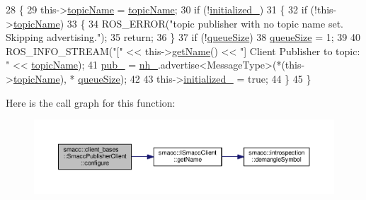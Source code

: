 \begin{DoxyCode}
28   \{
29     this->\hyperlink{classsmacc_1_1client__bases_1_1SmaccPublisherClient_a8b8d98aef9b3b3a441005d2cb17b4fcc}{topicName} = \hyperlink{classsmacc_1_1client__bases_1_1SmaccPublisherClient_a8b8d98aef9b3b3a441005d2cb17b4fcc}{topicName};
30     \textcolor{keywordflow}{if} (!\hyperlink{classsmacc_1_1client__bases_1_1SmaccPublisherClient_acb2fbd8b9797ce286d9ecc0419e2cc55}{initialized\_})
31     \{
32       \textcolor{keywordflow}{if} (!this->\hyperlink{classsmacc_1_1client__bases_1_1SmaccPublisherClient_a8b8d98aef9b3b3a441005d2cb17b4fcc}{topicName})
33       \{
34         ROS\_ERROR(\textcolor{stringliteral}{"topic publisher with no topic name set. Skipping advertising."});
35         \textcolor{keywordflow}{return};
36       \}
37       \textcolor{keywordflow}{if} (!\hyperlink{classsmacc_1_1client__bases_1_1SmaccPublisherClient_a1a9b98681b01953f134191799a029fd3}{queueSize})
38         \hyperlink{classsmacc_1_1client__bases_1_1SmaccPublisherClient_a1a9b98681b01953f134191799a029fd3}{queueSize} = 1;
39 
40       ROS\_INFO\_STREAM(\textcolor{stringliteral}{"["} << this->\hyperlink{classsmacc_1_1ISmaccClient_a20846aabfd1de832aa27d7a8237a1742}{getName}() << \textcolor{stringliteral}{"] Client Publisher to topic: "} << 
      \hyperlink{classsmacc_1_1client__bases_1_1SmaccPublisherClient_a8b8d98aef9b3b3a441005d2cb17b4fcc}{topicName});
41       \hyperlink{classsmacc_1_1client__bases_1_1SmaccPublisherClient_af39f498e73e8f956aae312065a4fd093}{pub\_} = \hyperlink{classsmacc_1_1client__bases_1_1SmaccPublisherClient_a83a44b5a1afd4d45140d4936f4011cc9}{nh\_}.advertise<MessageType>(*(this->\hyperlink{classsmacc_1_1client__bases_1_1SmaccPublisherClient_a8b8d98aef9b3b3a441005d2cb17b4fcc}{topicName}), *
      \hyperlink{classsmacc_1_1client__bases_1_1SmaccPublisherClient_a1a9b98681b01953f134191799a029fd3}{queueSize});
42 
43       this->\hyperlink{classsmacc_1_1client__bases_1_1SmaccPublisherClient_acb2fbd8b9797ce286d9ecc0419e2cc55}{initialized\_} = \textcolor{keyword}{true};
44     \}
45   \}
\end{DoxyCode}


Here is the call graph for this function\+:\nopagebreak
\begin{figure}[H]
\begin{center}
\leavevmode
\includegraphics[width=350pt]{classsmacc_1_1client__bases_1_1SmaccPublisherClient_ade7a2549ada725b8342633137eb6ad53_cgraph}
\end{center}
\end{figure}


